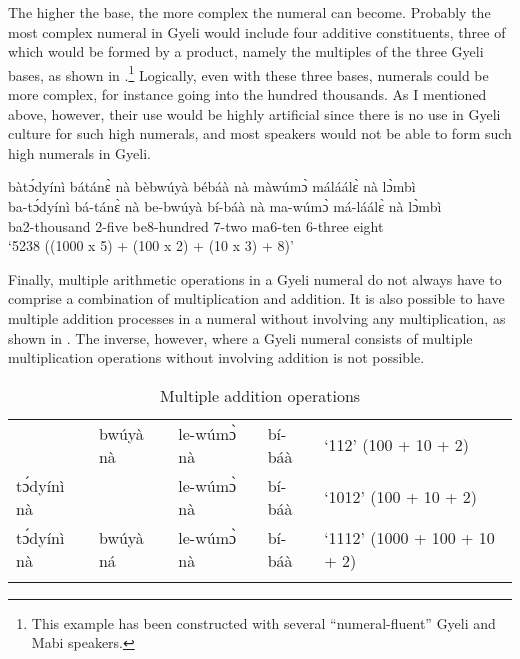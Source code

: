 The higher the base, the more complex the numeral can become. Probably the most complex numeral in Gyeli would include four additive constituents, three of which would be formed by a product, namely the multiples of the three Gyeli bases, as shown in .\footnote{This example has been constructed with several ``numeral-fluent'' Gyeli and Mabi speakers.} Logically, even with these three bases, numerals could be more complex, for instance going into the hundred thousands. As I mentioned above, however, their use would be highly artificial since there is no use in Gyeli culture for such high numerals, and most speakers would not be able to form such high numerals in Gyeli.

\ea\label{MostComp}
  \glll   bàtɔ́dyínì bátánɛ̀ nà bèbwúyà bébáà nà màwúmɔ̀ máláálɛ̀ nà lɔ̀mbì  \\
  ba-tɔ́dyínì bá-tánɛ̀ nà be-bwúyà bí-báà nà ma-wúmɔ̀ má-láálɛ̀ nà lɔ̀mbì  \\
ba2-thousand 2-five {\COM} be8-hundred 7-two {\COM} ma6-ten 6-three {\COM} eight \\
    \trans `5238 ((1000 x 5) + (100 x 2) + (10 x 3) + 8)'
\z

Finally, multiple arithmetic operations in a Gyeli numeral do not always have to comprise a combination of multiplication and addition.  It is also possible to have multiple addition processes in a numeral without involving any multiplication, as shown in . The inverse, however, where a Gyeli numeral consists of multiple multiplication operations without involving addition is not possible.

\begin{table}
\begin{tabular}{lllll}
 \lsptoprule
\multicolumn{5}{c}{Addition only} \\ 
  \midrule
& bwúyà nà &  le-wúmɔ̀ nà &  bí-báà & `112' (100 + 10 + 2) \\
tɔ́dyínì nà & & le-wúmɔ̀ nà &  bí-báà & `1012' (100 + 10 + 2) \\
tɔ́dyínì nà & bwúyà ná & le-wúmɔ̀ nà &  bí-báà & `1112' (1000 + 100 + 10 + 2) \\
  \lspbottomrule
\end{tabular}
\caption{Multiple addition operations}
\label{tab:NumOrderAdd}
\end{table}

